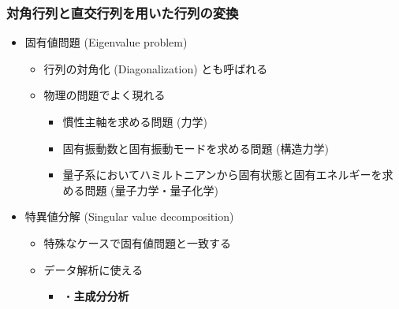 \documentclass[dvipdfmx,aspectratio=169,20pt]{beamer}
\newcommand{\myfontsetting}[3]{{\fontsize{#1}{#2}\selectfont #3}}
\begin{document}
\date[\todey]{}

\frame{\titlepage}

\begin{frame}
\frametitle{\large 対角行列と直交行列を用いた行列の変換}
\begin{itemize}
    \item \myfontsetting{18pt}{18pt}{ 
    固有値問題 \myfontsetting{12pt}{12pt}{ (Eigenvalue problem)}
    }
    \begin{itemize}
        \item \myfontsetting{12pt}{12pt}{ 
        行列の対角化 (Diagonalization) とも呼ばれる
        }
        \item
        \myfontsetting{12pt}{12pt}{
        物理の問題でよく現れる
        }
        \begin{itemize}
            \item \myfontsetting{10pt}{10pt}{ 慣性主軸を求める問題 (力学)
            }
            \item \myfontsetting{10pt}{10pt}{ 固有振動数と固有振動モードを求める問題 (構造力学)
            }
            \item \myfontsetting{10pt}{10pt}{ 量子系においてハミルトニアンから固有状態と固有エネルギーを求める問題 (量子力学・量子化学)
            }
        \end{itemize}
    \end{itemize}
    \item \myfontsetting{18pt}{18pt}{ 
    特異値分解 \myfontsetting{12pt}{12pt}{ (Singular value decomposition)}}
    \begin{itemize}
        \item
        \myfontsetting{12pt}{12pt}{ 特殊なケースで固有値問題と一致する}
        \item \myfontsetting{12pt}{12pt}{ 
        データ解析に使える
        }
        \begin{itemize}
            \item \myfontsetting{12pt}{12pt}{{\bf 最小2乗法}・{\bf 主成分分析}}
            
        \end{itemize}
    \end{itemize}
\end{itemize}
\end{frame}
\end{document}
